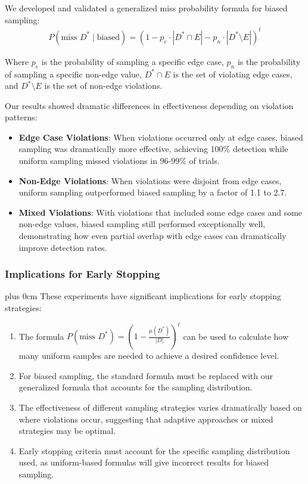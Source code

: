 \documentclass[conference]{IEEEtran}
\newcommand{\justifytext}{\leftskip=0pt \rightskip=0pt plus 0cm}
\begin{document}
We developed and validated a generalized miss probability formula for biased sampling:
\begin{align}
P(\text{miss }D^* \mid \text{biased}) = \left(1 - p_e\cdot|D^*\cap E| - p_n\cdot|D^*\setminus E|\right)^t
\end{align}

Where $p_e$ is the probability of sampling a specific edge case, $p_n$ is the probability of sampling a specific non-edge value, $D^*\cap E$ is the set of violating edge cases, and $D^*\setminus E$ is the set of non-edge violations.

Our results showed dramatic differences in effectiveness depending on violation patterns:

\begin{itemize}
\item \textbf{Edge Case Violations}: When violations occurred only at edge cases, biased sampling was dramatically more effective, achieving 100\% detection while uniform sampling missed violations in 96-99\% of trials.

\item \textbf{Non-Edge Violations}: When violations were disjoint from edge cases, uniform sampling outperformed biased sampling by a factor of 1.1 to 2.7.

\item \textbf{Mixed Violations}: With violations that included some edge cases and some non-edge values, biased sampling still performed exceptionally well, demonstrating how even partial overlap with edge cases can dramatically improve detection rates.
\end{itemize}

\subsubsection{Implications for Early Stopping}

\justifytext
These experiments have significant implications for early stopping strategies:

\begin{enumerate}
\item The formula $P(\text{miss }D^*) = \left(1 - \frac{\mu(D^*)}{|D|}\right)^t$ can be used to calculate how many uniform samples are needed to achieve a desired confidence level.

\item For biased sampling, the standard formula must be replaced with our generalized formula that accounts for the sampling distribution.

\item The effectiveness of different sampling strategies varies dramatically based on where violations occur, suggesting that adaptive approaches or mixed strategies may be optimal.

\item Early stopping criteria must account for the specific sampling distribution used, as uniform-based formulas will give incorrect results for biased sampling.
\end{enumerate}
\end{document}
